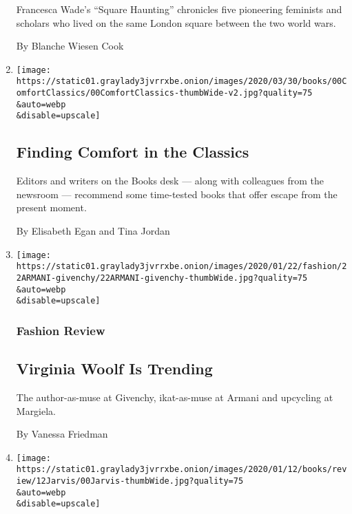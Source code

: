 \begin{enumerate}
  Francesca Wade's ``Square Haunting'' chronicles five pioneering
  feminists and scholars who lived on the same London square between the
  two world wars.

  By Blanche Wiesen Cook
\item
  \href{/2020/03/30/books/comforting-classic-books-virus.html}{}

  \texttt{[image: https://static01.graylady3jvrrxbe.onion/images/2020/03/30/books/00ComfortClassics/00ComfortClassics-thumbWide-v2.jpg?quality=75\\\&auto=webp\\\&disable=upscale]}

  \hypertarget{finding-comfort-in-the-classics}{%
  \subsection{Finding Comfort in the
  Classics}\label{finding-comfort-in-the-classics}}

  Editors and writers on the Books desk --- along with colleagues from
  the newsroom --- recommend some time-tested books that offer escape
  from the present moment.

  By Elisabeth Egan and Tina Jordan
\item
  \href{/2020/01/22/style/givenchy-margiela-armani-couture-paris.html}{}

  \texttt{[image: https://static01.graylady3jvrrxbe.onion/images/2020/01/22/fashion/22ARMANI-givenchy/22ARMANI-givenchy-thumbWide.jpg?quality=75\\\&auto=webp\\\&disable=upscale]}

  \hypertarget{fashion-review}{%
  \subsubsection{Fashion Review}\label{fashion-review}}

  \hypertarget{virginia-woolf-is-trending}{%
  \subsection{Virginia Woolf Is
  Trending}\label{virginia-woolf-is-trending}}

  The author-as-muse at Givenchy, ikat-as-muse at Armani and upcycling
  at Margiela.

  By Vanessa Friedman
\item
  \href{/2019/12/20/books/review/virginia-woolf-and-the-women-who-shaped-her-world-gillian-gill.html}{}

  \texttt{[image: https://static01.graylady3jvrrxbe.onion/images/2020/01/12/books/review/12Jarvis/00Jarvis-thumbWide.jpg?quality=75\\\&auto=webp\\\&disable=upscale]}


\end{enumerate}

